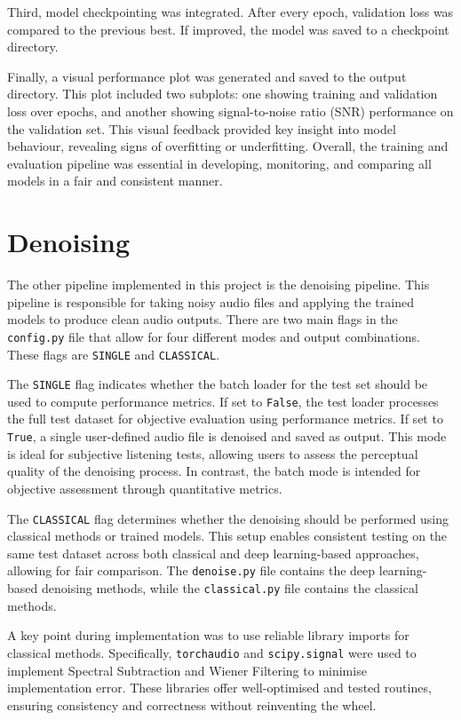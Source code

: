 Third, model checkpointing was integrated. After every epoch, validation loss was compared to the previous best. If improved, the model was saved to a checkpoint directory.

Finally, a visual performance plot was generated and saved to the output directory. This plot included two subplots: one showing training and validation loss over epochs, and another showing signal-to-noise ratio (SNR) performance on the validation set. This visual feedback provided key insight into model behaviour, revealing signs of overfitting or underfitting. Overall, the training and evaluation pipeline was essential in developing, monitoring, and comparing all models in a fair and consistent manner.


\section{Denoising}
\label{sec:denoising}

The other pipeline implemented in this project is the denoising pipeline. This pipeline is responsible for taking noisy audio files and applying the trained models to produce clean audio outputs. There are two main flags in the \texttt{config.py} file that allow for four different modes and output combinations. These flags are \texttt{SINGLE} and \texttt{CLASSICAL}.

The \texttt{SINGLE} flag indicates whether the batch loader for the test set should be used to compute performance metrics. If set to \texttt{False}, the test loader processes the full test dataset for objective evaluation using performance metrics. If set to \texttt{True}, a single user-defined audio file is denoised and saved as output. This mode is ideal for subjective listening tests, allowing users to assess the perceptual quality of the denoising process. In contrast, the batch mode is intended for objective assessment through quantitative metrics.

The \texttt{CLASSICAL} flag determines whether the denoising should be performed using classical methods or trained models. This setup enables consistent testing on the same test dataset across both classical and deep learning-based approaches, allowing for fair comparison. The \texttt{denoise.py} file contains the deep learning-based denoising methods, while the \texttt{classical.py} file contains the classical methods.

A key point during implementation was to use reliable library imports for classical methods. Specifically, \texttt{torchaudio} and \texttt{scipy.signal} were used to implement Spectral Subtraction and Wiener Filtering to minimise implementation error. These libraries offer well-optimised and tested routines, ensuring consistency and correctness without reinventing the wheel.

